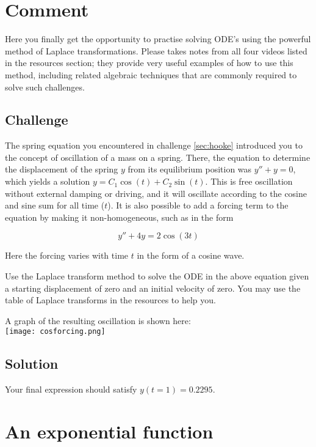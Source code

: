 \section*{Comment}
Here you finally get the opportunity to practise solving ODE's using the powerful method of Laplace transformations. Please takes notes from all four videos listed in the resources section; they provide very useful examples of how to use this method, including related algebraic techniques that are commonly required to solve such challenges.

\subsection*{Challenge}
The spring equation you encountered in challenge \ref{sec:hooke} introduced you to the concept of oscillation of a mass on a spring. There, the equation to determine the displacement of the spring $y$ from its equilibrium position was $y''+y=0$, which yields a solution $y=C_1 \cos(t) + C_2 \sin(t)$. This is free oscillation without external damping or driving, and it will oscillate according to the cosine and sine sum for all time ($t$). It is also possible to add a forcing term to the equation by making it non-homogeneous, such as in the form

\begin{equation}
    y'' + 4y = 2 \cos(3t)
\end{equation}

Here the forcing varies with time $t$ in the form of a cosine wave.

Use the Laplace transform method to solve the ODE in the above equation given a starting displacement of zero and an initial velocity of zero. You may use the table of Laplace transforms in the resources to help you.

A graph of the resulting oscillation is shown here:\\
\texttt{[image: cosforcing.png]}

\subsection*{Solution}
Your final expression should satisfy $y(t=1)=0.2295$.




\newpage
\section{An exponential function}

